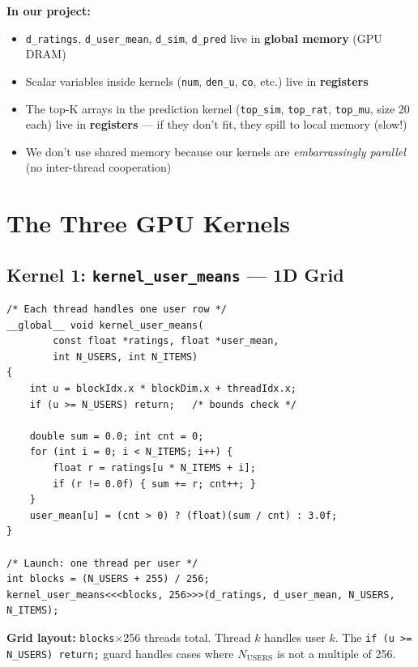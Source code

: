 \documentclass[12pt,a4paper]{article}
\begin{document}
\textbf{In our project:}
\begin{itemize}
    \item \texttt{d\_ratings}, \texttt{d\_user\_mean}, \texttt{d\_sim},
          \texttt{d\_pred} live in \textbf{global memory} (GPU DRAM)
    \item Scalar variables inside kernels (\texttt{num}, \texttt{den\_u},
          \texttt{co}, etc.) live in \textbf{registers}
    \item The top-K arrays in the prediction kernel
          (\texttt{top\_sim}, \texttt{top\_rat}, \texttt{top\_mu}, size 20
          each) live in \textbf{registers} — if they don't fit, they spill to
          local memory (slow!)
    \item We don't use shared memory because our kernels are
          \emph{embarrassingly parallel} (no inter-thread cooperation)
\end{itemize}

\section{The Three GPU Kernels}

\subsection{Kernel 1: \texttt{kernel\_user\_means} — 1D Grid}

\begin{lstlisting}
/* Each thread handles one user row */
__global__ void kernel_user_means(
        const float *ratings, float *user_mean,
        int N_USERS, int N_ITEMS)
{
    int u = blockIdx.x * blockDim.x + threadIdx.x;
    if (u >= N_USERS) return;   /* bounds check */

    double sum = 0.0; int cnt = 0;
    for (int i = 0; i < N_ITEMS; i++) {
        float r = ratings[u * N_ITEMS + i];
        if (r != 0.0f) { sum += r; cnt++; }
    }
    user_mean[u] = (cnt > 0) ? (float)(sum / cnt) : 3.0f;
}

/* Launch: one thread per user */
int blocks = (N_USERS + 255) / 256;
kernel_user_means<<<blocks, 256>>>(d_ratings, d_user_mean, N_USERS, N_ITEMS);
\end{lstlisting}

\textbf{Grid layout:} \texttt{blocks}$\times$256 threads total.  Thread $k$
handles user $k$.  The \texttt{if (u >= N\_USERS) return;} guard handles
cases where $N_{\text{USERS}}$ is not a multiple of 256.
\end{document}
